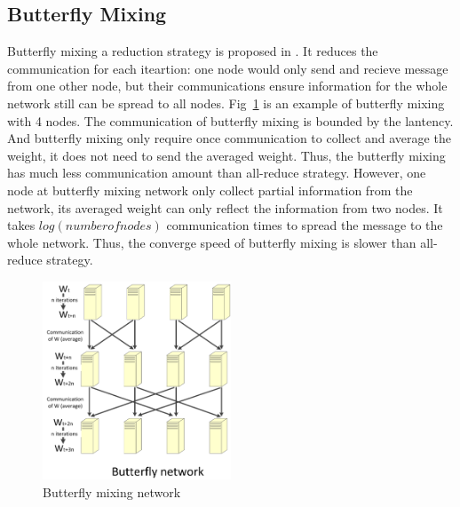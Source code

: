\documentclass{article}
\begin{document}
\subsection{Butterfly Mixing}
Butterfly mixing a reduction strategy is proposed in \cite{zhao2013butterfly}. It reduces the communication for each 
iteartion: one node would only send and recieve message from one other node, but their communications ensure information 
for the whole network still can be spread to all nodes. Fig~\ref{fig:butterfly} is an example of butterfly mixing with 4 
nodes. The communication of butterfly mixing is bounded by the lantency. And butterfly mixing only require 
once communication to collect and average the weight, it does not need to send the averaged weight. Thus, the 
butterfly mixing has much less communication amount than all-reduce strategy. However, one node at butterfly mixing 
network only collect partial information from the network, its averaged weight can only reflect the information 
from two nodes. It takes $log(number of nodes)$ communication times to spread the message to the whole network. 
Thus, the converge speed of butterfly mixing is slower than all-reduce strategy. 
\begin{figure}[htb]
  \centering
  \includegraphics[width=0.5\textwidth]{butterfly.jpg}
  \caption{Butterfly mixing network}
  \label{fig:butterfly}
\end{figure}
\end{document}
